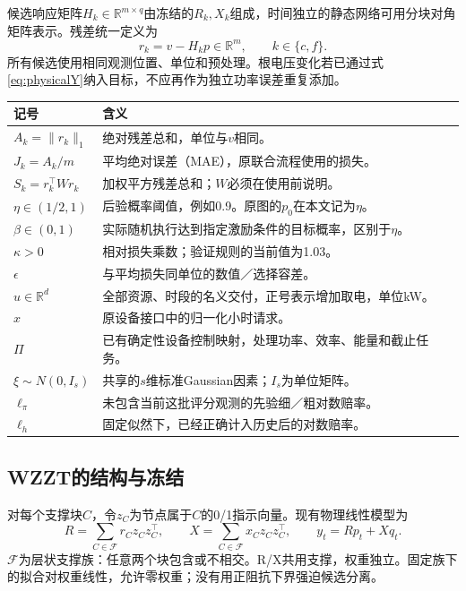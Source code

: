 \documentclass[UTF8,11pt,a4paper,fontset=fandol]{ctexart}
\newcommand{\R}{\mathbb R}
\numberwithin{equation}{section}
\begin{document}
候选响应矩阵$H_k\in\R^{m\times q}$由冻结的$R_k,X_k$组成，时间独立的静态网络可用分块对角矩阵表示。残差统一定义为
\begin{equation}
r_k=v-H_kp\in\R^m,\qquad k\in\{c,f\}.
\label{eq:residual}
\end{equation}
所有候选使用相同观测位置、单位和预处理。根电压变化若已通过式\eqref{eq:physicalY}纳入目标，不应再作为独立功率误差重复添加。

\begin{longtable}{p{28mm}p{\dimexpr\linewidth-28mm-4\tabcolsep\relax}}
\toprule 记号&含义\\\midrule\endhead
$A_k=\|r_k\|_1$&绝对残差总和，单位与$v$相同。\\
$J_k=A_k/m$&平均绝对误差（MAE），原联合流程使用的损失。\\
$S_k=r_k^\top Wr_k$&加权平方残差总和；$W$必须在使用前说明。\\
$\eta\in(1/2,1)$&后验概率阈值，例如0.9。原图的$p_0$在本文记为$\eta$。\\
$\beta\in(0,1)$&实际随机执行达到指定激励条件的目标概率，区别于$\eta$。\\
$\kappa>0$&相对损失乘数；验证规则的当前值为1.03。\\
$\epsilon$&与平均损失同单位的数值／选择容差。\\
$u\in\R^d$&全部资源、时段的名义交付，正号表示增加取电，单位kW。\\
$x$&原设备接口中的归一化小时请求。\\
$\Pi$&已有确定性设备控制映射，处理功率、效率、能量和截止任务。\\
$\xi\sim N(0,I_s)$&共享的$s$维标准Gaussian因素；$I_s$为单位矩阵。\\
$\ell_\pi$&未包含当前这批评分观测的先验细／粗对数赔率。\\
$\ell_h$&固定似然下，已经正确计入历史后的对数赔率。\\\bottomrule
\end{longtable}

\subsection{WZZT的结构与冻结}
对每个支撑块$C$，令$z_C$为节点属于$C$的0/1指示向量。现有物理线性模型为
\begin{equation}
R=\sum_{C\in\mathcal F}r_Cz_Cz_C^\top,\qquad
X=\sum_{C\in\mathcal F}x_Cz_Cz_C^\top,\qquad
y_t=Rp_t+Xq_t.
\label{eq:laminar}
\end{equation}
$\mathcal F$为层状支撑族：任意两个块包含或不相交。R/X共用支撑，权重独立。固定族下的拟合对权重线性，允许零权重；没有用正阻抗下界强迫候选分离。
\end{document}

